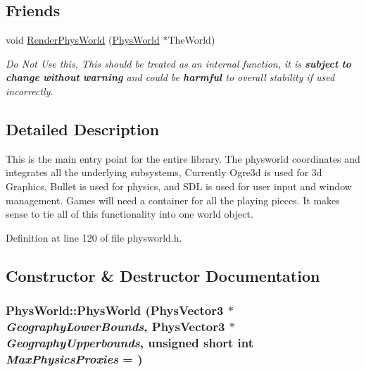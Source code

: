 \subsection*{Friends}
\begin{DoxyCompactItemize}
\item 
void \hyperlink{classPhysWorld_a54ca2a75bbccb9b2129f434874f1e693}{RenderPhysWorld} (\hyperlink{classPhysWorld}{PhysWorld} $\ast$TheWorld)
\begin{DoxyCompactList}\small\item\em Do Not Use this, This should be treated as an internal function, it is {\bfseries subject} {\bfseries to} {\bfseries change} {\bfseries without} {\bfseries warning} and could be {\bfseries harmful} to overall stability if used incorrectly. \item\end{DoxyCompactList}\end{DoxyCompactItemize}


\subsection{Detailed Description}
This is the main entry point for the entire library. The physworld coordinates and integrates all the underlying subsystems, Currently Ogre3d is used for 3d Graphics, Bullet is used for physics, and SDL is used for user input and window management. Games will need a container for all the playing pieces. It makes sense to tie all of this functionality into one world object. 

Definition at line 120 of file physworld.h.

\subsection{Constructor \& Destructor Documentation}
\hypertarget{classPhysWorld_a3228c98369082139722d3c918d735e6c}{
\subsubsection[{PhysWorld}]{\setlength{\rightskip}{0pt plus 5cm}PhysWorld::PhysWorld ({\bf PhysVector3} $\ast$ {\em GeographyLowerBounds}, \/  {\bf PhysVector3} $\ast$ {\em GeographyUpperbounds}, \/  unsigned short int {\em MaxPhysicsProxies} = {})}}
\label{db/df5/classPhysWorld_a3228c98369082139722d3c918d735e6c}


